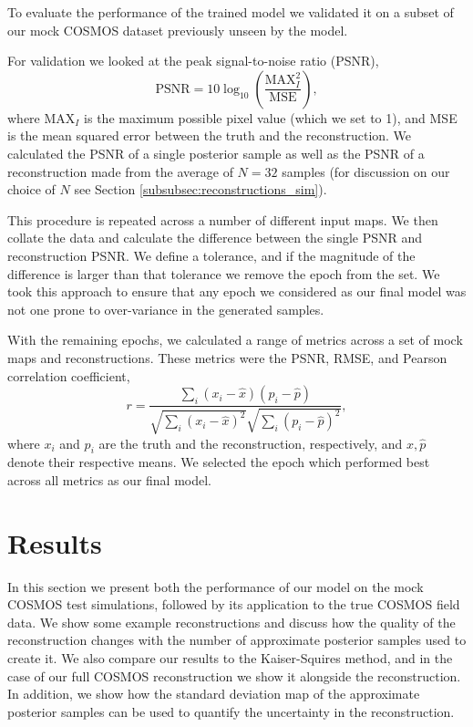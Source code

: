\documentclass[fleqn,usenatbib]{mnras}
\begin{document}
To evaluate the performance of the trained model we validated it on a subset of our mock COSMOS dataset previously unseen by the model.

For validation we looked at the peak signal-to-noise ratio (PSNR), 
\begin{equation}
	\text{PSNR} = 10 \log_{10}\left(\dfrac{\text{MAX}_I^2}{\text{MSE}}\right),
\end{equation}
where $\text{MAX}_I$ is the maximum possible pixel value (which we set to 1), and MSE is the mean squared error between the truth and the reconstruction. We calculated the PSNR of a single posterior sample as well as the PSNR of a reconstruction made from the average of $N=32$ samples (for discussion on our choice of $N$ see Section \ref{subsubsec:reconstructions_sim}). 

This procedure is repeated across a number of different input maps. We then collate the data and calculate the difference between the single PSNR and reconstruction PSNR. We define a tolerance, and if the magnitude of the difference is larger than that tolerance we remove the epoch from the set. We took this approach to ensure that any epoch we considered as our final model was not one prone to over-variance in the generated samples.

With the remaining epochs, we calculated a range of metrics across a set of mock maps and reconstructions. These metrics were the PSNR, RMSE, and Pearson correlation coefficient,
\begin{equation}
	r = \dfrac{\sum\limits_i(x_i - \hat{x})(p_i - \hat{p})}{\sqrt{\sum\limits_i(x_i - \hat{x})^2}\sqrt{\sum\limits_i(p_i - \hat{p})^2}},
\end{equation}
where $x_i$ and $p_i$ are the truth and the reconstruction, respectively, and $\hat{x}, \hat{p}$ denote their respective means. We selected the epoch which performed best across all metrics as our final model.

\section{Results}\label{sec:results}

In this section we present both the performance of our model on the mock COSMOS test simulations, followed by its application to the true COSMOS field data. We show some example reconstructions and discuss how the quality of the reconstruction changes with the number of approximate posterior samples used to create it. We also compare our results to the Kaiser-Squires method, and in the case of our full COSMOS reconstruction we show it alongside the \citet{remy2023probabilistic} reconstruction. In addition, we show how the standard deviation map of the approximate posterior samples can be used to quantify the uncertainty in the reconstruction.
\end{document}
